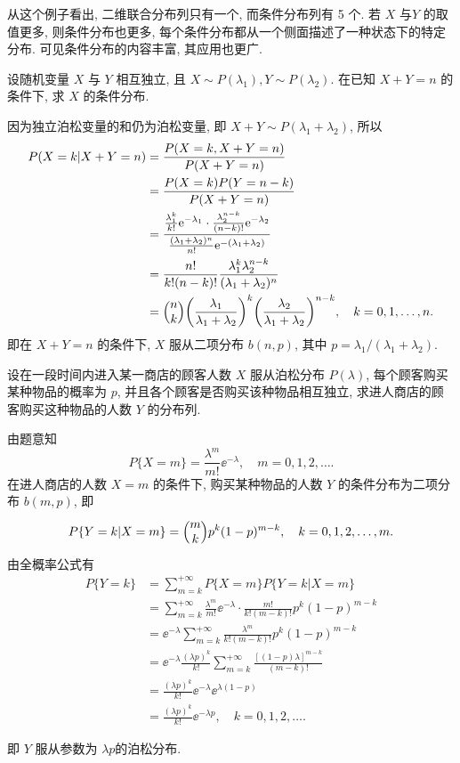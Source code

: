 	从这个例子看出, 二维联合分布列只有一个, 而条件分布列有 5 个. 若 $X$ 与$Y$ 的取值更多, 则条件分布也更多,
	每个条件分布都从一个侧面描述了一种状态下的特定分布. 可见条件分布的内容丰富, 其应用也更广.
	\begin{example}\label{exam:3.5.2}
		设随机变量 $X$ 与 $Y$ 相互独立, 且 $X\sim P(\lambda_1),Y\sim P(\lambda_2)$. 在已知 $X+Y=n$ 的条件下, 求 $X$ 的条件分布.
	\end{example}
	\begin{solution}
		因为独立泊松变量的和仍为泊松变量, 即 $X+Y\sim P(\lambda_1+\lambda_2)$, 所以
		\begin{align*}
			P(X=k | X+Y=n) &=\frac{P(X=k, X+Y=n)}{P(X+Y=n)} \\
			&=\frac{P(X=k) P(Y=n-k)}{P(X+Y=n)} \\
			&=\frac{\frac{\lambda_1^k}{k!}\ee^{-\lambda_1}\cdot\frac{\lambda_2^{n-k}}{(n-k)!}\ee^{-\lambda_2}}
			{\frac{(\lambda_1+\lambda_2)^n}{n!}\ee^{-(\lambda_1+\lambda_2)}}\\
			&=\frac{n!}{k!(n-k)!}\frac{\lambda_1^k\lambda_2^{n-k}}{(\lambda_1+\lambda_2)^n}\\
			&=\Binom{n}{k}\left(\frac{\lambda_1}{\lambda_1+\lambda_2}\right)^k
			\left(\frac{\lambda_2}{\lambda_1+\lambda_2}\right)^{n-k},\quad k=0,1,\dots,n.
		\end{align*}
		即在 $X+Y=n$ 的条件下, $X$ 服从二项分布 $b(n,p)$, 其中 $p=\lambda_1/(\lambda_1+\lambda_2)$.
	\end{solution}
	\begin{example}\label{exam:3.5.3}
		设在一段时间内进入某一商店的顾客人数 $X$ 服从泊松分布 $P(\lambda)$, 每个顾客购买某种物品的概率为 $p$,
		并且各个顾客是否购买该种物品相互独立, 求进人商店的顾客购买这种物品的人数 $Y$ 的分布列.
	\end{example}
	\begin{solution}
		由题意知
		\[
		 	P\{X=m\}=\frac{\lambda^{m}}{m !} \ee^{-\lambda}, \quad m=0,1,2, \dots.
		\]
		在进人商店的人数 $X=m$ 的条件下, 购买某种物品的人数 $Y$ 的条件分布为二项分布 $b(m,p)$, 即
		\[
			P\{ Y=k | X=m \}=\Binom{m}{k}p^{k}(1-p)^{m-k}, \quad k=0,1,2, \dots, m.
		\]
		由全概率公式有
		\begin{align*}
			P\{Y=k\} &=\sum_{m=k}^{+\infty} P\{X=m\}P\{Y=k | X=m\}\\
			&=\sum_{m=k}^{+\infty} \frac{\lambda^{m}}{m !} \ee^{-\lambda} \cdot \frac{m !}{k !(m-k) !} p^{k}(1-p)^{m-k} \\
			&=\ee^{-\lambda} \sum_{m=k}^{+\infty} \frac{\lambda^{m}}{k !(m-k) !} p^{k}(1-p)^{m-k}\\
			&=\ee^{-\lambda} \frac{(\lambda p)^{k}}{k !} \sum_{m=k}^{+\infty} \frac{[(1-p) \lambda]^{m-k}}{(m-k) !} \\
			&=\frac{(\lambda p)^{k}}{k !} \ee^{-\lambda} \ee^{\lambda(1-p)} \\
			&=\frac{(\lambda p)^{k}}{k !} \ee^{-\lambda p}, \quad k=0,1,2, \dots.
		\end{align*}
	\end{solution}
	即 $Y$ 服从参数为 $\lambda p$的泊松分布.

